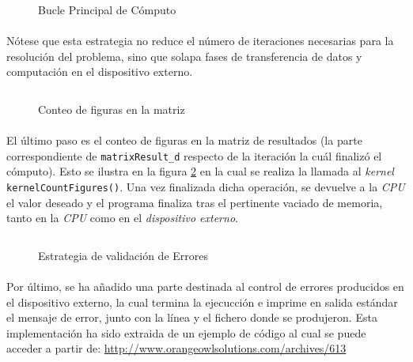\documentclass[10pt, a4paper,spanish]{article}
\begin{document}
		\begin{figure}[h]
			\centering
			\inputminted{cuda}{./code/compu.cu}
			\caption{Bucle Principal de Cómputo}
			\label{code:compu}
		\end{figure}

		\paragraph{}
		Nótese que esta estrategia no reduce el número de iteraciones necesarias para la resolución del problema, sino que solapa fases de transferencia de datos y computación en el dispositivo externo.

		\begin{figure}[h]
			\centering
			\inputminted{cuda}{./code/count.cu}
			\caption{Conteo de figuras en la matriz}
			\label{code:count}
		\end{figure}

		\paragraph{}
		El último paso es el conteo de figuras en la matriz de resultados (la parte correspondiente de \texttt{matrixResult\_d} respecto de la iteración la cuál finalizó el cómputo). Esto se ilustra en la figura \ref{code:count} en la cual se realiza la llamada al \emph{kernel} \texttt{kernelCountFigures()}. Una vez finalizada dicha operación, se devuelve a la \emph{CPU} el valor deseado y el programa finaliza tras el pertinente vaciado de memoria, tanto en la \emph{CPU} como en el \emph{dispositivo externo}.

		\begin{figure}[h]
			\centering
			\inputminted{cuda}{./code/error.cu}
			\caption{Estrategia de validación de Errores}
			\label{code:error}
		\end{figure}

		\paragraph{}
		Por último, se ha añadido una parte destinada al control de errores producidos en el dispositivo externo, la cual termina la ejecucción e imprime en salida estándar el mensaje de error, junto con la línea y el fichero donde se produjeron. Esta implementación ha sido extraida de un ejemplo de código al cual se puede acceder a partir de: \url{http://www.orangeowlsolutions.com/archives/613} \cite{orangeowlsolutions:error}
\end{document}
